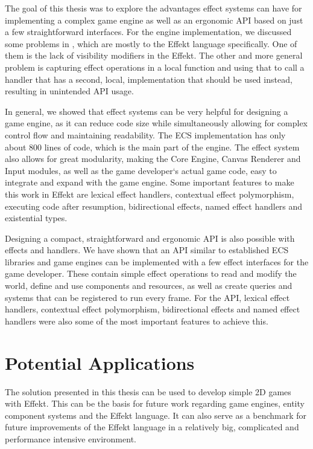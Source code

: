 \label{chap:conclusion}

The goal of this thesis was to explore the advantages effect systems can have for implementing a complex game engine as well as an ergonomic API based on just a few straightforward interfaces. For the engine implementation, we discussed some problems in , which are mostly to the Effekt language specifically. One of them is the lack of visibility modifiers in the Effekt. The other and more general problem is capturing effect operations in a local function and using that to call a handler that has a second, local, implementation that should be used instead, resulting in unintended API usage.

In general, we showed that effect systems can be very helpful for designing a game engine, as it can reduce code size while simultaneously allowing for complex control flow and maintaining readability. The ECS implementation has only about 800 lines of code, which is the main part of the engine. The effect system also allows for great modularity, making the Core Engine, Canvas Renderer and Input modules, as well as the game developer`s actual game code, easy to integrate and expand with the game engine. Some important features to make this work in Effekt are lexical effect handlers, contextual effect polymorphism, executing code after resumption, bidirectional effects, named effect handlers and existential types.

Designing a compact, straightforward and ergonomic API is also possible with effects and handlers. We have shown that an API similar to established ECS libraries and game engines can be implemented with a few effect interfaces for the game developer. These contain simple effect operations to read and modify the world, define and use components and resources, as well as create queries and systems that can be registered to run every frame. For the API, lexical effect handlers, contextual effect polymorphism, bidirectional effects and named effect handlers were also some of the most important features to achieve this.

\section*{Potential Applications}

The solution presented in this thesis can be used to develop simple 2D games with Effekt. This can be the basis for future work regarding game engines, entity component systems and the Effekt language. It can also serve as a benchmark for future improvements of the Effekt language in a relatively big, complicated and performance intensive environment.

